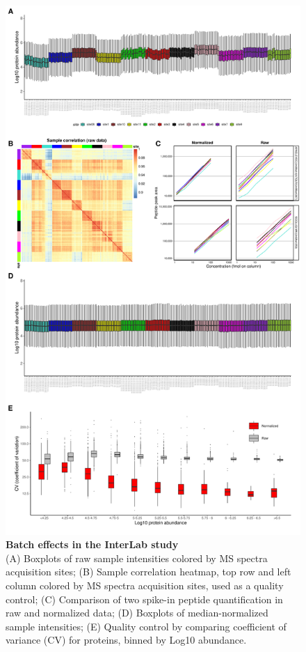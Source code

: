\documentclass[num-refs]{wiley-article}
\begin{document}
\begin{figure}
	\centering
	\includegraphics[width=\textwidth,height=.9\textheight,keepaspectratio]{figures/Supp_InterLab.pdf}
	\caption{\textbf{Batch effects in the InterLab study}\\
		 \footnotesize  (A) Boxplots of raw sample intensities colored by MS spectra acquisition sites; (B) Sample correlation heatmap, top row and left column colored by MS spectra acquisition sites, used as a quality control; (C) Comparison of two spike-in peptide quantification in raw and normalized data; (D) Boxplots of median-normalized sample intensities; (E) Quality control by comparing coefficient of variance (CV) for proteins, binned by Log10 abundance.}
	\label{fig:batch_figS1_InterLab}
\end{figure}
\end{document}
